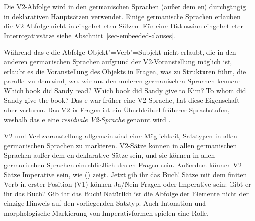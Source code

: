 Die V2-Abfolge wird in den germanischen Sprachen (außer dem en) durchgängig in deklarativen Hauptsätzen verwendet.
Einige germanische Sprachen erlauben die V2-Abfolge nicht in eingebetteten Sätzen. Für eine Diskussion
eingebetteter Interrogativsätze siehe Abschnitt~\ref{sec-embeeded-clauses}.

Während das e die Abfolge Objekt"=Verb"=Subjekt nicht erlaubt, die in den anderen germanischen
Sprachen aufgrund der V2-Voranstellung möglich ist, erlaubt es die Voranstellung des Objekts in Fragen, was zu
Strukturen führt, die parallel zu dem sind, was wir aus den anderen germanischen Sprachen kennen:
\eal
\ex\label{ex-which-book-did-sandy-read}
Which book did Sandy read?
\ex\label{ex-which-book-did-sandy-give-to-kim}
Which book did Sandy give to Kim?
\ex To whom did Sandy give the book?
\zl
Das e war früher eine V2-Sprache, hat diese Eigenschaft aber verloren. Das V2 in Fragen ist ein Überbleibsel früherer
Sprachstufen, weshalb das e eine \emph{residuale V2-Sprache} genannt wird \citep[]{Rizzi1990a-u}.

V2 und Verbvoranstellung allgemein sind eine Möglichkeit, Satztypen in allen germanischen Sprachen zu markieren. V2-Sätze
können in allen germanischen Sprachen außer dem en deklarative Sätze sein, und sie können in allen
germanischen Sprachen einschließlich des en Fragen sein. Außerdem können V2-Sätze Imperative sein, wie () zeigt.
\ea
Jetzt gib ihr das Buch!
\z
Sätze mit dem finiten Verb in erster Position (V1) können Ja/Nein-Fragen oder Imperative sein:
\eal
\ex
Gibt er ihr das Buch?
\ex
Gib ihr das Buch!
\zl
Natürlich ist die Abfolge der Elemente nicht der einzige Hinweis auf den vorliegenden Satztyp. Auch Intonation und morphologische Markierung von Imperativformen spielen eine Rolle.

